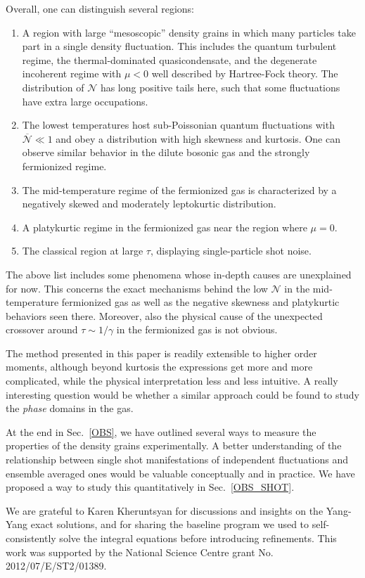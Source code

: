 \documentclass[aps,twocolumn,pra,superscriptaddress,nofootinbib,amsmath,amssymb,floats,floatfix,english]{revtex4-1}
\newcommand{\mc}[1]{{\mathcal{#1}}}
\newcommand{\wb}[1]{{\overline{#1}}}
\begin{document}
Overall, one can distinguish several regions: 
\begin{enumerate}
\item A region with large ``mesoscopic'' density grains in which  many particles take part in a single density fluctuation. 
This includes the quantum turbulent regime, the thermal-dominated quasicondensate, and the degenerate incoherent regime with $\mu<0$ well described by Hartree-Fock theory.
The distribution of $\mc{N}$ has long positive tails here, such that some fluctuations have extra large occupations.
\item The lowest temperatures host sub-Poissonian quantum fluctuations with $\wb{\mc{N}}\ll1$ and obey a distribution with high skewness and kurtosis. One can observe similar behavior in the dilute bosonic gas and the strongly fermionized regime.
\item The mid-temperature regime of the fermionized gas is characterized by a negatively skewed and moderately leptokurtic distribution.
\item A platykurtic regime in the fermionized gas near the region where $\mu=0$.
\item The classical region at large $\tau$, displaying single-particle shot noise. 
\end{enumerate}


The above list includes some phenomena whose in-depth causes are unexplained for now. This concerns  the exact mechanisms behind the low $\mc{N}$ in the mid-temperature fermionized gas as well as the negative skewness and platykurtic behaviors seen there. Moreover, also the physical cause of the unexpected crossover around $\tau\sim1/\gamma$ in the fermionized gas is not obvious.


The method presented in this paper is readily extensible to higher order moments, although beyond kurtosis the expressions get more and more complicated, while the physical interpretation less and less intuitive. A really interesting question would be whether a similar approach could be found to study the \emph{phase} domains in the gas.

At the end in Sec.~\ref{OBS}, we have outlined several ways to measure the properties of the density grains experimentally.  
A better understanding of the relationship between single shot manifestations of independent fluctuations and ensemble averaged ones would be valuable conceptually and in practice.
We have proposed a way to study this quantitatively in Sec.~\ref{OBS_SHOT}.





\acknowledgments
We are grateful to Karen Kheruntsyan for discussions and insights on the Yang-Yang exact solutions, and for sharing the baseline program we used to self-consistently solve the integral equations before introducing refinements.
 This work was supported by the National Science Centre grant No. 2012/07/E/ST2/01389. 



\end{document}
